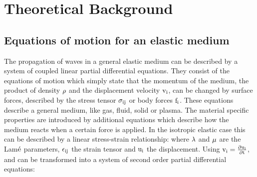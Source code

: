 
\chapter{Theoretical Background}


\section{Equations of motion for an elastic medium}\label{elastic_fd_model} 
The propagation of waves in a general elastic medium can be described by a system of coupled linear partial differential equations. They consist of the equations of motion
which simply state that the momentum of the medium, the product of density $\rm{\rho}$ and the displacement velocity $\rm{v_i}$, can be changed by surface forces, described by the stress tensor $\rm{\sigma_{ij}}$ or body forces $\rm{f_i}$. These equations describe a general medium, like gas, fluid, solid or plasma. The material specific properties are introduced by additional equations which describe how the medium reacts when a certain force is applied. In the isotropic elastic case this can be described by a linear stress-strain relationship:  
where $\rm{\lambda}$ and $\rm{\mu}$ are the Lam$\rm{\acute{e}}$ parameters, $\rm{\epsilon_{ij}}$ the strain tensor and $\rm{u_i}$ the displacement. Using $\rm{v_i = \frac{\partial u_i}{\partial t}}$,  and  can be transformed into a system of second order partial differential equations:
